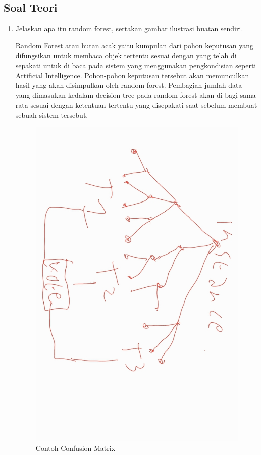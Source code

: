 \subsection{Soal Teori}
\begin{enumerate}
\item Jelaskan apa itu random forest, sertakan gambar ilustrasi buatan sendiri.\par
Random Forest atau hutan acak yaitu kumpulan dari pohon keputusan yang difungsikan untuk membaca objek tertentu sesuai dengan yang telah di sepakati untuk di baca pada sistem yang menggunakan pengkondisian seperti Artificial Intelligence. Pohon-pohon keputusan tersebut akan memunculkan hasil yang akan disimpulkan oleh random forest. Pembagian jumlah data yang dimasukan kedalam decision tree pada random forest akan di bagi sama rata sesuai dengan ketentuan tertentu yang disepakati saat sebelum membuat sebuah sistem tersebut.
\begin{figure}[H]
    \centering
    \includegraphics[scale=0.2]{figures/1174035/chapter3/random_forest.jpeg}
    \caption{Contoh Confusion Matrix}
    \label{contoh}
\end{figure}


\end{enumerate}

